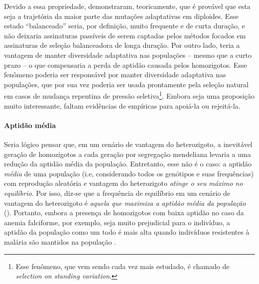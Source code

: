 \begin{refsection}
    
%
Devido a essa propriedade, \textcite{Sellis2011a} demonstraram, teoricamente, que é provável que esta seja a trajetória da maior parte das mutações adaptativas em diploides. Esse estado \enquote{balanceado} seria, por definição, muito frequente e de curta duração, e não deixaria assinaturas passíveis de serem captadas pelos métodos focados em assinaturas de seleção balanceadora de longa duração. Por outro lado, teria a vantagem de manter diversidade adaptativa nas populações -- mesmo que a curto prazo -- o que compensaria a perda de aptidão causada pelos homozigotos. Esse fenômeno poderia ser responsável por manter diversidade adaptativa nas populações, que por sua vez poderia ser usada prontamente pela seleção natural em casos de mudança repentina de pressão seletiva\footnote{Esse fenômeno, que vem sendo cada vez mais estudado, é chamado de \emph{selection on standing variation}.}. Embora seja uma proposição muito interessante, faltam evidências de empíricas para apoiá-la ou rejeitá-la.

\paragraph{Aptidão média} %
%
Seria lógico pensar que, em um cenário de vantagem do heterozigoto, a inevitável geração de homozigotos a cada geração por segregação mendeliana levaria a uma redução da aptidão média da população. Entretanto, esse não é o caso: a aptidão \emph{média} de uma população (i.e, considerando todos os genótipos e suas frequências) com reprodução aleatória e vantagem do heterozigoto \emph{atinge o seu máximo no equilíbrio}. Por isso, diz-se que a frequência de equilíbrio em um cenário de vantagem do heterozigoto é \emph{aquela que maximiza a aptidão média da população} (\cite{Charlesworth2010,Andres2011}). Portanto, embora a presença de homozigotos com baixa aptidão no caso da anemia falciforme, por exemplo, seja muito prejudicial para o indivíduo, a aptidão da população como um todo é mais alta quando indivíduos resistentes à malária são mantidos na população \parencite{Charlesworth2010, Wright1937}.
%

\end{refsection}
